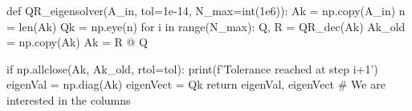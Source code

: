 \documentclass{article}
\begin{document}
\begin{elegantcode}[title={Implementazione in Python del QR Eigensolver}]
def QR_eigensolver(A_in, tol=1e-14, N_max=int(1e6)):
    Ak = np.copy(A_in)
    n = len(Ak)
    Qk = np.eye(n)
    for i in range(N_max):
        Q, R = QR_dec(Ak)
        Ak_old = np.copy(Ak)
        Ak = R @ Q
        
        if np.allclose(Ak, Ak_old, rtol=tol):
            print(f'Tolerance reached at step {i+1}')
            eigenVal = np.diag(Ak)
            eigenVect = Qk
            return eigenVal, eigenVect    # We are interested in the columns
\end{elegantcode}
\end{document}
